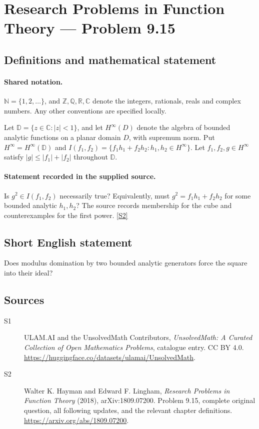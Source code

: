 \documentclass[11pt]{book}
\newcommand{\sref}[2]{\hyperlink{source:#1:#2}{[S#2]}}
\begin{document}
\section{Research Problems in Function Theory — Problem 9.15}\label{statement}

\subsection{Definitions and mathematical statement}

\paragraph{Shared notation.}$\mathbb N=\{1,2,\ldots\}$, and $\mathbb Z,\mathbb Q,\mathbb R,\mathbb C$ denote the integers, rationals, reals and complex numbers. Any other conventions are specified locally.


Let $\mathbb D=\{z\in\mathbb C:|z|<1\}$, and let $H^{\infty}(D)$ denote the algebra of bounded analytic functions on a planar domain $D$, with supremum norm. Put $H^{\infty}=H^{\infty}(\mathbb D)$ and $I(f_1,f_2)=\{f_1h_1+f_2h_2:h_1,h_2\in H^{\infty}\}$. Let $f_1,f_2,g\in H^{\infty}$ satisfy $|g|\le|f_1|+|f_2|$ throughout $\mathbb D$.
\paragraph{Statement recorded in the supplied source.}
Is $g^2\in I(f_1,f_2)$ necessarily true? Equivalently, must $g^2=f_1h_1+f_2h_2$ for some bounded analytic $h_1,h_2$? The source records membership for the cube and counterexamples for the first power. \sref{statement}{2}
\subsection{Short English statement}
Does modulus domination by two bounded analytic generators force the square into their ideal?
\subsection{Sources}
\begin{description}
\item[\hypertarget{source:statement:1}{S1}] ULAM.AI and the UnsolvedMath Contributors, \emph{UnsolvedMath: A Curated Collection of Open Mathematics Problems}, catalogue entry. CC BY 4.0. \url{https://huggingface.co/datasets/ulamai/UnsolvedMath}.
\item[\hypertarget{source:statement:2}{S2}] Walter K. Hayman and Edward F. Lingham, \emph{Research Problems in Function Theory} (2018), arXiv:1809.07200. Problem 9.15, complete original question, all following updates, and the relevant chapter definitions. \url{https://arxiv.org/abs/1809.07200}.
\end{description}
\label{end:statement}
\end{document}
